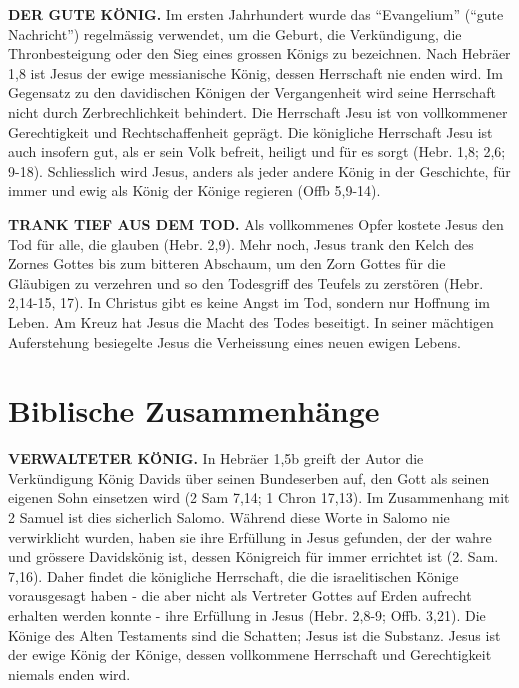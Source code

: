 \documentclass[]{krantz}
\begin{document}
\textbf{DER GUTE KÖNIG.} Im ersten Jahrhundert wurde das ``Evangelium''
(``gute Nachricht'') regelmässig verwendet, um die Geburt, die
Verkündigung, die Thronbesteigung oder den Sieg eines grossen Königs zu
bezeichnen. Nach Hebräer 1,8 ist Jesus der ewige messianische König,
dessen Herrschaft nie enden wird. Im Gegensatz zu den davidischen
Königen der Vergangenheit wird seine Herrschaft nicht durch
Zerbrechlichkeit behindert. Die Herrschaft Jesu ist von vollkommener
Gerechtigkeit und Rechtschaffenheit geprägt. Die königliche Herrschaft
Jesu ist auch insofern gut, als er sein Volk befreit, heiligt und für es
sorgt (Hebr. 1,8; 2,6; 9-18). Schliesslich wird Jesus, anders als jeder
andere König in der Geschichte, für immer und ewig als König der Könige
regieren (Offb 5,9-14).

\textbf{TRANK TIEF AUS DEM TOD.} Als vollkommenes Opfer kostete Jesus
den Tod für alle, die glauben (Hebr. 2,9). Mehr noch, Jesus trank den
Kelch des Zornes Gottes bis zum bitteren Abschaum, um den Zorn Gottes
für die Gläubigen zu verzehren und so den Todesgriff des Teufels zu
zerstören (Hebr. 2,14-15, 17). In Christus gibt es keine Angst im Tod,
sondern nur Hoffnung im Leben. Am Kreuz hat Jesus die Macht des Todes
beseitigt. In seiner mächtigen Auferstehung besiegelte Jesus die
Verheissung eines neuen ewigen Lebens.

\section{Biblische Zusammenhänge}\label{biblische-zusammenhuxe4nge-1}

\textbf{VERWALTETER KÖNIG.} In Hebräer 1,5b greift der Autor die
Verkündigung König Davids über seinen Bundeserben auf, den Gott als
seinen eigenen Sohn einsetzen wird (2 Sam 7,14; 1 Chron 17,13). Im
Zusammenhang mit 2 Samuel ist dies sicherlich Salomo. Während diese
Worte in Salomo nie verwirklicht wurden, haben sie ihre Erfüllung in
Jesus gefunden, der der wahre und grössere Davidskönig ist, dessen
Königreich für immer errichtet ist (2. Sam. 7,16). Daher findet die
königliche Herrschaft, die die israelitischen Könige vorausgesagt haben
- die aber nicht als Vertreter Gottes auf Erden aufrecht erhalten werden
konnte - ihre Erfüllung in Jesus (Hebr. 2,8-9; Offb. 3,21). Die Könige
des Alten Testaments sind die Schatten; Jesus ist die Substanz. Jesus
ist der ewige König der Könige, dessen vollkommene Herrschaft und
Gerechtigkeit niemals enden wird.
\end{document}
